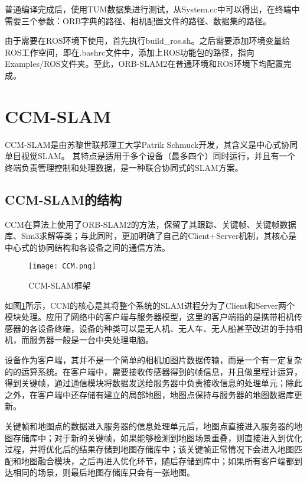 普通编译完成后，使用TUM数据集进行测试，从System.cc中可以得出，在终端中需要三个参数：ORB字典的路径、相机配置文件的路径、数据集的路径。

由于需要在ROS环境下使用，首先执行build\_ros.sh。之后需要添加环境变量给ROS工作空间，即在.bashrc文件中，添加上ROS功能包的路径，指向Examples/ROS文件夹。至此，ORB-SLAM2在普通环境和ROS环境下均配置完成。

\section{CCM-SLAM}

CCM-SLAM是由苏黎世联邦理工大学Patrik Schmuck开发，其含义是中心式协同单目视觉SLAM。
其特点是适用于多个设备（最多四个）同时运行，并且有一个终端负责管理控制和处理数据，是一种联合协同式的SLAM方案。

\subsection{CCM-SLAM的结构} \label{3.3.1}

CCM在算法上使用了ORB-SLAM2的方法，保留了其跟踪、关键帧、关键帧数据库、Sim3求解等类；与此同时，更加明确了自己的Client+Server机制，其核心是中心式的协同结构和各设备之间的通信方法。

\begin{figure}[!ht]
	\centering
	\texttt{[image: CCM.png]}
	\caption{CCM-SLAM框架}
	\label{fig11}
\end{figure}

如图\ref{fig11}所示，CCM的核心是其将整个系统的SLAM进程分为了Client和Server两个模块处理。应用了网络中的客户端与服务器模型，这里的客户端指的是携带相机传感器的各设备终端，设备的种类可以是无人机、无人车、无人船甚至改进的手持相机，而服务器一般是一台中央处理电脑。

设备作为客户端，其并不是一个简单的相机加图片数据传输，而是一个有一定复杂的的运算系统。在客户端中，需要接收传感器得到的帧信息，并且做里程计运算，得到关键帧，通过通信模块将数据发送给服务器中负责接收信息的处理单元；除此之外，在客户端中还存储有建立的局部地图，地图点保持与服务器的地图数据库更新。

关键帧和地图点的数据进入服务器的信息处理单元后，地图点直接进入服务器的地图存储库中；对于新的关键帧，如果能够检测到地图场景重叠，则直接进入到优化过程，并将优化后的结果存储到地图存储库中；该关键帧正常情况下会进入地图匹配和地图融合模块，之后再进入优化环节，随后存储到库中；如果所有客户端都到达相同的场景，则最后地图存储库只会有一张地图\cite{schmuck2019ccm}。

